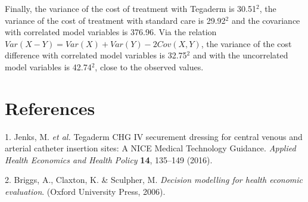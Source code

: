 \documentclass[]{article}
\begin{document}
Finally, the variance of the cost of treatment with Tegaderm is
30.51\(^2\), the variance of the cost of treatment with standard care is
29.92\(^2\) and the covariance with correlated model variables is
376.96. Via the relation \(Var(X-Y) = Var(X) + Var(Y) - 2Cov(X,Y)\), the
variance of the cost difference with correlated model variables is
32.75\(^2\) and with the uncorrelated model variables is 42.74\(^2\),
close to the observed values.

\hypertarget{references}{%
\section*{References}\label{references}}

\hypertarget{refs}{}
\leavevmode\hypertarget{ref-jenks:2016a}{}%
1. Jenks, M. \emph{et al.} Tegaderm CHG IV securement dressing for
central venous and arterial catheter insertion sites: A NICE Medical
Technology Guidance. \emph{Applied Health Economics and Health Policy}
\textbf{14}, 135--149 (2016).

\leavevmode\hypertarget{ref-briggs:2002a}{}%
2. Briggs, A., Claxton, K. \& Sculpher, M. \emph{Decision modelling for
health economic evaluation}. (Oxford University Press, 2006).
\end{document}
